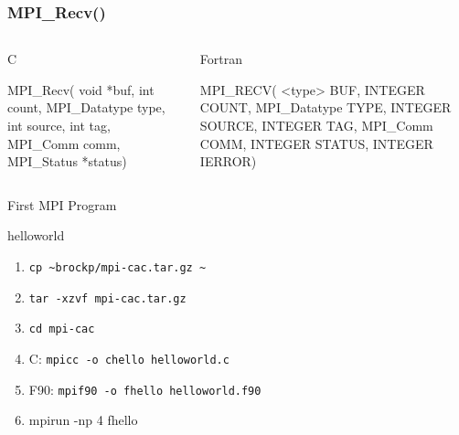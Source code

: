 \documentclass[handout]{beamer}
\begin{document}
\begin{frame}[fragile]
 \frametitle{MPI\_Recv()}
   \begin{columns}[T]
    \begin{column}{5cm}
     \begin{block}{C}
      \begin{semiverbatim}
MPI\_Recv( void   *buf,
           int  count,
  MPI\_Datatype   type,
           int source,
           int    tag,
      MPI\_Comm   comm,
    MPI\_Status  *status)
      \end{semiverbatim}
     \end{block}
    \end{column}
    \begin{column}{5cm}
     \begin{block}{Fortran}
      \begin{semiverbatim}
MPI\_RECV( <type>    BUF,
      INTEGER     COUNT,
 MPI\_Datatype      TYPE,
      INTEGER    SOURCE,
      INTEGER       TAG,
     MPI\_Comm      COMM,
      INTEGER    STATUS,
      INTEGER     IERROR)
      \end{semiverbatim}
     \end{block}
    \end{column}
   \end{columns}
\end{frame}

\begin{frame}{First MPI Program}
\begin{block}{helloworld}
 \begin{enumerate}
  \item<1->\texttt{cp \~{}brockp/mpi-cac.tar.gz \~{}}
  \item<1->\texttt{tar -xzvf mpi-cac.tar.gz}
  \item<1->\texttt{cd mpi-cac}
  \item<2-> C: \texttt{mpicc -o chello helloworld.c}
  \item<2-> F90: \texttt{mpif90 -o fhello helloworld.f90}
  \item<3-> mpirun -np 4 fhello
 \end{enumerate}
\end{block}
\end{frame}
\end{document}
